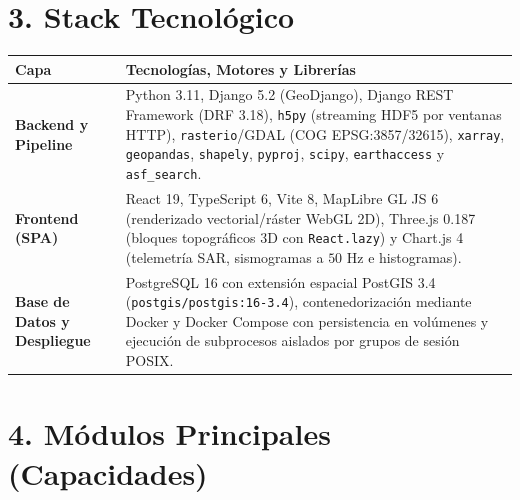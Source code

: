 \documentclass[11pt,a4paper]{article}
\begin{document}
\section*{3. Stack Tecnol\'ogico}

\begin{tabularx}{\textwidth}{@{}l X@{}}

\toprule

\textbf{Capa} & \textbf{Tecnolog\'ias, Motores y Librer\'ias} \\

\midrule

\textbf{Backend y Pipeline} & Python 3.11, Django 5.2 (GeoDjango), Django REST Framework (DRF 3.18), \texttt{h5py} (streaming HDF5 por ventanas HTTP), \texttt{rasterio}/GDAL (COG EPSG:3857/32615), \texttt{xarray}, \texttt{geopandas}, \texttt{shapely}, \texttt{pyproj}, \texttt{scipy}, \texttt{earthaccess} y \texttt{asf\_search}. \\

\addlinespace[3pt]

\textbf{Frontend (SPA)} & React 19, TypeScript 6, Vite 8, MapLibre GL JS 6 (renderizado vectorial/r\'aster WebGL 2D), Three.js 0.187 (bloques topogr\'aficos 3D con \texttt{React.lazy}) y Chart.js 4 (telemetr\'ia SAR, sismogramas a $50\text{ Hz}$ e histogramas). \\

\addlinespace[3pt]

\textbf{Base de Datos y Despliegue} & PostgreSQL 16 con extensi\'on espacial PostGIS 3.4 (\texttt{postgis/postgis:16-3.4}), contenedorizaci\'on mediante Docker y Docker Compose con persistencia en vol\'umenes y ejecuci\'on de subprocesos aislados por grupos de sesi\'on POSIX. \\

\bottomrule

\end{tabularx}

\section*{4. M\'odulos Principales (Capacidades)}
\end{document}
